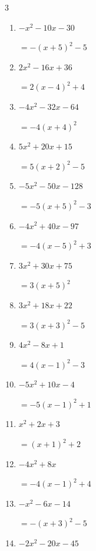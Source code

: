 \begin{multicols}{3}
\begin{enumerate}
        $=5\left( x+3\right)^{2}+2$

  \item $-x^{2}-10x-30$

        $=-\left( x+5\right)^{2}-5$

  \item $2x^{2}-16x+36$

        $=2\left( x-4\right)^{2}+4$

  \item $-4x^{2}-32x-64$

        $=-4\left( x+4\right)^{2}$

  \item $5x^{2}+20x+15$

        $=5\left( x+2\right)^{2}-5$

  \item $-5x^{2}-50x-128$

        $=-5\left( x+5\right)^{2}-3$

  \item $-4x^{2}+40x-97$

        $=-4\left( x-5\right)^{2}+3$

  \item $3x^{2}+30x+75$

        $=3\left( x+5\right)^{2}$

  \item $3x^{2}+18x+22$

        $=3\left( x+3\right)^{2}-5$

\columnbreak %

  \item $4x^{2}-8x+1$

        $=4\left( x-1\right)^{2}-3$

  \item $-5x^{2}+10x-4$

        $=-5\left( x-1\right)^{2}+1$

  \item $x^{2}+2x+3$

        $=\left( x+1\right)^{2}+2$

  \item $-4x^{2}+8x$

        $=-4\left( x-1\right)^{2}+4$

  \item $-x^{2}-6x-14$

        $=-\left( x+3\right)^{2}-5$

  \item $-2x^{2}-20x-45$


\end{enumerate}
\end{multicols}
